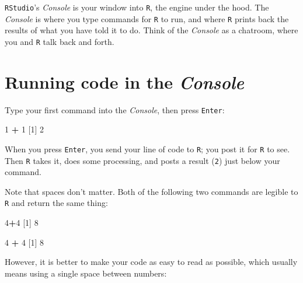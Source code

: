 \documentclass[
]{book}
\newenvironment{Shaded}{\begin{snugshade}}{\end{snugshade}}
\newcommand{\DecValTok}[1]{\textcolor[rgb]{0.00,0.00,0.81}{#1}}
\newcommand{\NormalTok}[1]{#1}
\newcommand{\OperatorTok}[1]{\textcolor[rgb]{0.81,0.36,0.00}{\textbf{#1}}}
\newcommand{\StringTok}[1]{\textcolor[rgb]{0.31,0.60,0.02}{#1}}
\begin{document}
\texttt{RStudio}'s \emph{Console} is your window into \texttt{R}, the engine under the hood. The \emph{Console} is where you type commands for \texttt{R} to run, and where \texttt{R} prints back the results of what you have told it to do. Think of the \emph{Console} as a chatroom, where you and \texttt{R} talk back and forth.

\hypertarget{running-code-in-the-console}{%
\section*{\texorpdfstring{Running code in the \emph{Console}}{Running code in the Console}}\label{running-code-in-the-console}}

Type your first command into the \emph{Console}, then press \texttt{Enter}:

\begin{Shaded}
\begin{Highlighting}[]
\DecValTok{1} \OperatorTok{+}\StringTok{ }\DecValTok{1}
\NormalTok{[}\DecValTok{1}\NormalTok{] }\DecValTok{2}
\end{Highlighting}
\end{Shaded}

When you press \texttt{Enter}, you send your line of code to \texttt{R}; you post it for \texttt{R} to see. Then \texttt{R} takes it, does some processing, and posts a result (\texttt{2}) just below your command.

Note that spaces don't matter. Both of the following two commands are legible to \texttt{R} and return the same thing:

\begin{Shaded}
\begin{Highlighting}[]
\DecValTok{4}\OperatorTok{+}\DecValTok{4}
\NormalTok{[}\DecValTok{1}\NormalTok{] }\DecValTok{8}
\end{Highlighting}
\end{Shaded}

\begin{Shaded}
\begin{Highlighting}[]
\DecValTok{4}        \OperatorTok{+}\StringTok{        }\DecValTok{4}
\NormalTok{[}\DecValTok{1}\NormalTok{] }\DecValTok{8}
\end{Highlighting}
\end{Shaded}

However, it is better to make your code as easy to read as possible, which usually means using a single space between numbers:
\end{document}
